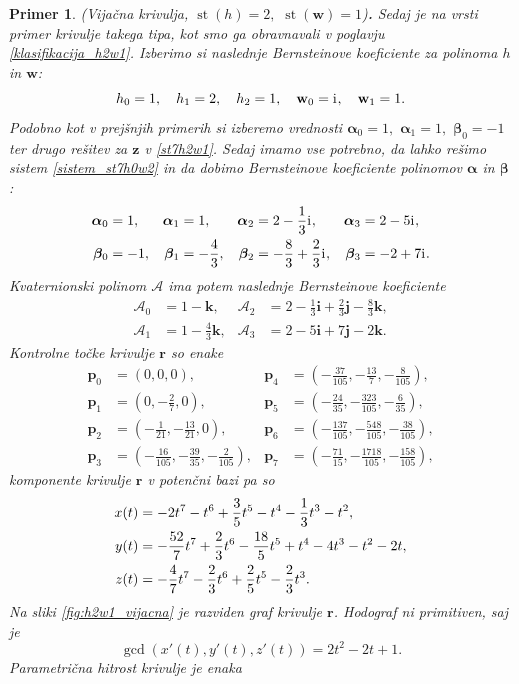 \documentclass[12pt,a4paper,twoside]{article}
\newcommand{\iu}{\mathrm{i}\mkern1mu} %
\theoremstyle{definition} %
\theoremstyle{plain} %
\theoremstyle{primerstyle}
\newtheorem{primer}[definicija]{Primer}
\numberwithin{equation}{section}  %
\newcommand{\pV}{\mathbf{p}}
\newcommand{\rV}{\mathbf{r}}
\newcommand{\iV}{\mathbf{i}}
\newcommand{\jV}{\mathbf{j}}
\newcommand{\kV}{\mathbf{k}}
\newcommand{\wV}{\mathbf{w}}
\newcommand{\zV}{\mathbf{z}}
\newcommand{\AQ}{\mathcal{A}}
\newcommand{\balpha}{\boldsymbol \alpha}
\newcommand{\bbeta}{\boldsymbol \beta}
\DeclareMathOperator{\st}{st}
\begin{document}
\begin{primer}
	\label{primer_h2w1_vijacna}
	\textnormal{ }(Vijačna krivulja, $\st(h)=2,$ $\st(\wV)=1$)\textbf{.}
	Sedaj je na vrsti primer krivulje takega tipa, kot smo ga obravnavali v poglavju \ref{klasifikacija_h2w1}. Izberimo si naslednje Bernsteinove koeficiente za polinoma $h$ in $\wV$:
	$$h_0=1,\quad h_1=2,\quad h_2=1,\quad\wV_0=\iu,\quad\wV_1=1.$$
	Podobno kot v prejšnjih primerih si izberemo vrednosti $\balpha_0=1,$ $\balpha_1=1,$ $\bbeta_0=-1$ ter drugo rešitev za $\zV$ v \eqref{st7h2w1}. Sedaj imamo vse potrebno, da lahko rešimo sistem \eqref{sistem_st7h0w2} in da dobimo Bernsteinove koeficiente polinomov $\balpha$ in $\bbeta$:
	\begin{align*}
		\balpha_0&=1,&\balpha_1&=1,&\balpha_2&=2-\frac{1}{3}\iu,&\balpha_3&=2-5\iu,\\
		\bbeta_0&=-1,&\bbeta_1&=-\frac{4}{3},&\bbeta_2&=-\frac{8}{3}+\frac{2}{3}\iu,&\bbeta_3&=-2+7\iu.
	\end{align*}
	Kvaternionski polinom $\AQ$ ima potem naslednje Bernsteinove koeficiente
	\begin{align*}
		\AQ_0&=1-\kV,&\AQ_2&=2-\frac{1}{3}\iV+\frac{2}{3}\jV-\frac{8}{3}\kV,\\
		\AQ_1&=1-\frac{4}{3}\kV,&\AQ_3&=2-5\iV+7\jV-2\kV.
	\end{align*}
	Kontrolne točke krivulje $\rV$ so enake
	\begin{align*}
		\pV_0&=(0,0,0),&\pV_4&=\left(-\frac{37}{105},-\frac{13}{7},-\frac{8}{105}\right),\\
		\pV_1&=\left(0,-\frac{2}{7},0\right),&\pV_5&=\left(-\frac{24}{35},-\frac{323}{105},-\frac{6}{35}\right),\\
		\pV_2&=\left(-\frac{1}{21},-\frac{13}{21},0\right),&\pV_6&=\left(-\frac{137}{105},-\frac{548}{105},-\frac{38}{105}\right),\\
		\pV_3&=\left(-\frac{16}{105},-\frac{39}{35},-\frac{2}{105}\right),&\pV_7&=\left(-\frac{71}{15},-\frac{1718}{105},-\frac{158}{105}\right),
	\end{align*}
	komponente krivulje $\rV$ v potenčni bazi pa so
	\begin{align}
		x(t)&=-2t^7-t^6+\frac{3}{5}t^5-t^4-\frac{1}{3}t^3-t^2,\notag\\
		y(t)&=-\frac{52}{7}t^7+\frac{2}{3}t^6-\frac{18}{5}t^5+t^4-4t^3-t^2-2t,\label{primer_h2w1_vijacna_krivulja}\\
		z(t)&=-\frac{4}{7}t^7-\frac{2}{3}t^6+\frac{2}{5}t^5-\frac{2}{3}t^3.\notag
	\end{align}
	Na sliki \ref{fig:h2w1_vijacna} je razviden graf krivulje $\rV$. Hodograf ni primitiven, saj je $$\gcd(x'(t),y'(t),z'(t))=2t^2-2t+1.$$ Parametrična hitrost krivulje je enaka

\end{primer}
\end{document}
